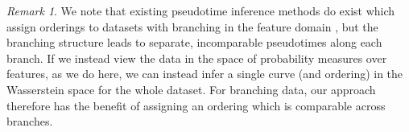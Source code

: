 \documentclass[aos, preprint]{imsart}
\theoremstyle{plain}
\theoremstyle{remark}
\newtheorem{rem}[example]{Remark}
\begin{document}
\begin{appendix}
\begin{rem}
We note that existing pseudotime inference methods do exist which assign orderings to datasets with branching in the feature domain \cite{saelens2019comparison}, but the branching structure leads to separate, incomparable pseudotimes along each branch. If we instead view the data in the space of probability measures over features, as we do here, we can instead infer a single curve (and ordering) in the Wasserstein space for the whole dataset. For branching data, our approach therefore has the benefit of assigning an ordering which is comparable across branches.
\end{rem}


\end{appendix}
\end{document}
